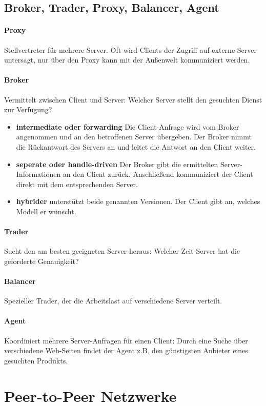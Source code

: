 \documentclass[a4paper]{article}
\begin{document}
	\subsection{Broker, Trader, Proxy, Balancer, Agent}
		\paragraph{Proxy}Stellvertreter für mehrere Server. Oft wird Clients der Zugriff auf externe Server untersagt, nur über den Proxy kann mit der Außenwelt kommuniziert werden.
		\paragraph{Broker} Vermittelt zwischen Client und Server: Welcher Server stellt den gesuchten Dienst zur Verfügung?
			\begin{itemize}
				\item \textbf{intermediate oder forwarding} Die Client-Anfrage wird vom Broker angenommen und an den betroffenen Server übergeben. Der Broker nimmt die Rückantwort des Servers an und leitet die Antwort an den Client weiter.
				\item \textbf{seperate oder handle-driven} Der Broker gibt die ermittelten Server-Informationen an den Client zurück. Anschließend kommuniziert der Client direkt mit dem entsprechenden Server.
				\item \textbf{hybrider} unterstützt beide genannten Versionen. Der Client gibt an, welches Modell er wünscht.
			\end{itemize}
		\paragraph{Trader} Sucht den am besten geeigneten Server heraus: Welcher Zeit-Server hat die geforderte Genauigkeit?
		\paragraph{Balancer}Spezieller Trader, der die Arbeitslast auf verschiedene Server verteilt.
		\paragraph{Agent}Koordiniert mehrere Server-Anfragen für einen Client: Durch eine Suche über verschiedene Web-Seiten findet der Agent z.B. den günstigsten Anbieter eines gesuchten Produkts.
\pagebreak
\section{Peer-to-Peer Netzwerke}
\end{document}
